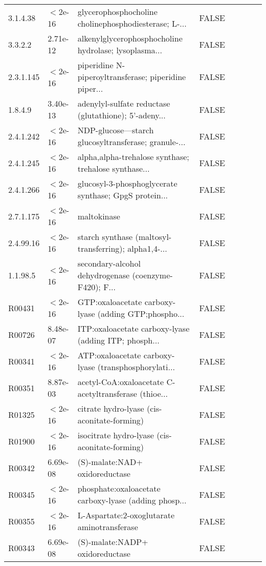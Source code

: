 \documentclass{article}\usepackage[]{graphicx}\usepackage[]{color}
\begin{document}
{{\begin{tabular}{llllllll}
  3.1.4.38 & $<$2e-16 & glycerophosphocholine cholinephosphodiesterase; L-... & FALSE &  &  &  &  \\ 
  3.3.2.2 &  2.71e-12 & alkenylglycerophosphocholine hydrolase; lysoplasma... & FALSE &  &  &  &  \\ 
  2.3.1.145 & $<$2e-16 & piperidine N-piperoyltransferase; piperidine piper... & FALSE &  &  &  &  \\ 
  1.8.4.9 &  3.40e-13 & adenylyl-sulfate reductase (glutathione); 5'-adeny... & FALSE &  &  &  &  \\ 
  2.4.1.242 & $<$2e-16 & NDP-glucose---starch glucosyltransferase; granule-... & FALSE &  &  &  &  \\ 
  2.4.1.245 & $<$2e-16 & alpha,alpha-trehalose synthase; trehalose synthase... & FALSE &  &  &  &  \\ 
  2.4.1.266 & $<$2e-16 & glucosyl-3-phosphoglycerate synthase; GpgS protein... & FALSE &  &  &  &  \\ 
  2.7.1.175 & $<$2e-16 & maltokinase & FALSE &  &  &  &  \\ 
  2.4.99.16 & $<$2e-16 & starch synthase (maltosyl-transferring); alpha1,4-... & FALSE &  &  &  &  \\ 
  1.1.98.5 & $<$2e-16 & secondary-alcohol dehydrogenase (coenzyme-F420); F... & FALSE &  &  &  &  \\ 
  R00431 & $<$2e-16 & GTP:oxaloacetate carboxy-lyase (adding GTP;phospho... & FALSE &  &  &  &  \\ 
  R00726 &  8.48e-07 & ITP:oxaloacetate carboxy-lyase (adding ITP; phosph... & FALSE &  &  &  &  \\ 
  R00341 & $<$2e-16 & ATP:oxaloacetate carboxy-lyase (transphosphorylati... & FALSE &  &  &  &  \\ 
  R00351 &  8.87e-03 & acetyl-CoA:oxaloacetate C-acetyltransferase (thioe... & FALSE &  &  &  &  \\ 
  R01325 & $<$2e-16 & citrate hydro-lyase (cis-aconitate-forming) & FALSE &  &  &  &  \\ 
  R01900 & $<$2e-16 & isocitrate hydro-lyase (cis-aconitate-forming) & FALSE &  &  &  &  \\ 
  R00342 &  6.69e-08 & (S)-malate:NAD+ oxidoreductase & FALSE &  &  &  &  \\ 
  R00345 & $<$2e-16 & phosphate:oxaloacetate carboxy-lyase (adding phosp... & FALSE &  &  &  &  \\ 
  R00355 & $<$2e-16 & L-Aspartate:2-oxoglutarate aminotransferase & FALSE &  &  &  &  \\ 
  R00343 &  6.69e-08 & (S)-malate:NADP+ oxidoreductase & FALSE &  &  &  &  \\ 

\end{tabular}}}
\end{document}
